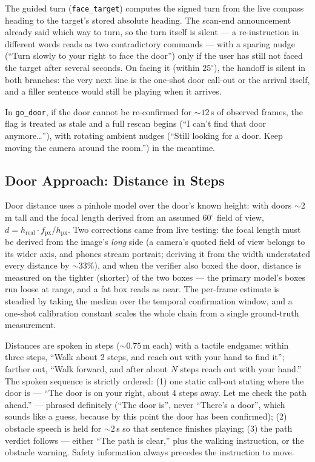 The guided turn (\texttt{face\_target}) computes the signed turn from the live
compass heading to the target's stored absolute heading. The scan-end announcement
already said which way to turn, so the turn itself is silent --- a re-instruction
in different words reads as two contradictory commands --- with a sparing nudge
(``Turn slowly to your right to face the door'') only if the user has still not
faced the target after several seconds. On facing it (within $25^\circ$), the
handoff is silent in both branches: the very next line is the one-shot door
call-out or the arrival itself, and a filler sentence would still be playing when
it arrives.

In \texttt{go\_door}, if the door cannot be re-confirmed for ${\sim}12$\,s of
observed frames, the flag is treated as stale and a full rescan begins (``I can't
find that door anymore\ldots''), with rotating ambient nudges (``Still looking for
a door. Keep moving the camera around the room.'') in the meantime.

\subsection{Door Approach: Distance in Steps}
\label{sec:door_distance}

Door distance uses a pinhole model over the door's known height: with doors
${\sim}2$\,m tall and the focal length derived from an assumed $60^\circ$ field of
view, $d = h_{\text{real}} \cdot f_{\text{px}} / h_{\text{px}}$. Two corrections
came from live testing: the focal length must be derived from the image's
\emph{long} side (a camera's quoted field of view belongs to its wider axis, and
phones stream portrait; deriving it from the width understated every distance by
${\sim}33\%$), and when the verifier also boxed the door, distance is measured on
the tighter (shorter) of the two boxes --- the primary model's boxes run loose at
range, and a fat box reads as near. The per-frame estimate is steadied by taking
the median over the temporal confirmation window, and a one-shot calibration
constant scales the whole chain from a single ground-truth measurement.

Distances are spoken in steps (${\sim}0.75$\,m each) with a tactile endgame: within
three steps, ``Walk about 2 steps, and reach out with your hand to find it'';
farther out, ``Walk forward, and after about $N$ steps reach out with your hand.''
The spoken sequence is strictly ordered: (1) one static call-out stating where the
door is --- ``The door is on your right, about 4 steps away. Let me check the path
ahead.'' --- phrased definitely (``The door is'', never ``There's a door'', which
sounds like a guess, because by this point the door has been confirmed); (2)
obstacle speech is held for ${\sim}2$\,s so that sentence finishes playing; (3) the
path verdict follows --- either ``The path is clear,'' plus the walking
instruction, or the obstacle warning. Safety information always precedes the
instruction to move.

